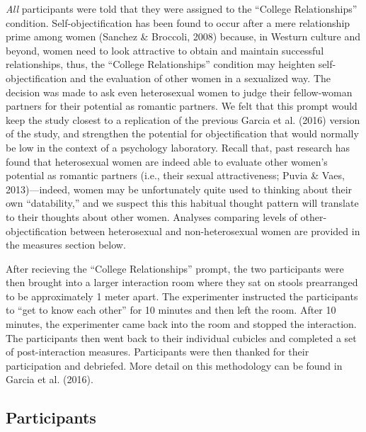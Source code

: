 \documentclass[man]{apa6}
\begin{document}
\emph{All} participants were told that they were assigned to the
\enquote{College Relationships} condition. Self-objectification has been
found to occur after a mere relationship prime among women (Sanchez \&
Broccoli, 2008) because, in Westurn culture and beyond, women need to
look attractive to obtain and maintain successful relationships, thus,
the \enquote{College Relationships} condition may heighten
self-objectification and the evaluation of other women in a sexualized
way. The decision was made to ask even heterosexual women to judge their
fellow-woman partners for their potential as romantic partners. We felt
that this prompt would keep the study closest to a replication of the
previous Garcia et al. (2016) version of the study, and strengthen the
potential for objectification that would normally be low in the context
of a psychology laboratory. Recall that, past research has found that
heterosexual women are indeed able to evaluate other women's potential
as romantic partners (i.e., their sexual attractiveness; Puvia \& Vaes,
2013)---indeed, women may be unfortunately quite used to thinking about
their own \enquote{datability,} and we suspect this this habitual
thought pattern will translate to their thoughts about other women.
Analyses comparing levels of other-objectification between heterosexual
and non-heterosexual women are provided in the measures section below.

After recieving the \enquote{College Relationships} prompt, the two
participants were then brought into a larger interaction room where they
sat on stools prearranged to be approximately 1 meter apart. The
experimenter instructed the participants to \enquote{get to know each
other} for 10 minutes and then left the room. After 10 minutes, the
experimenter came back into the room and stopped the interaction. The
participants then went back to their individual cubicles and completed a
set of post-interaction measures. Participants were then thanked for
their participation and debriefed. More detail on this methodology can
be found in Garcia et al. (2016).

\subsection{Participants}\label{participants}
\end{document}
